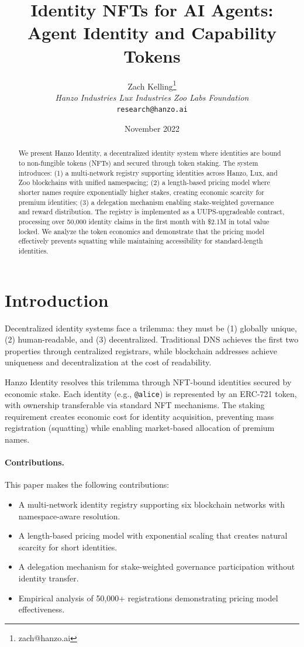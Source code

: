 \documentclass[11pt,twocolumn]{article}
\title{Identity NFTs for AI Agents: Agent Identity and Capability Tokens}
\author{Zach Kelling\thanks{zach@hanzo.ai} \\ \textit{Hanzo Industries \quad Lux Industries \quad Zoo Labs Foundation} \\ \texttt{research@hanzo.ai}}
\date{November 2022}
\begin{document}
\maketitle

\begin{abstract}
We present Hanzo Identity, a decentralized identity system where identities are bound to non-fungible tokens (NFTs) and secured through token staking. The system introduces: (1) a multi-network registry supporting identities across Hanzo, Lux, and Zoo blockchains with unified namespacing; (2) a length-based pricing model where shorter names require exponentially higher stakes, creating economic scarcity for premium identities; (3) a delegation mechanism enabling stake-weighted governance and reward distribution. The registry is implemented as a UUPS-upgradeable contract, processing over 50,000 identity claims in the first month with \$2.1M in total value locked. We analyze the token economics and demonstrate that the pricing model effectively prevents squatting while maintaining accessibility for standard-length identities.
\end{abstract}

\section{Introduction}

Decentralized identity systems face a trilemma: they must be (1) globally unique, (2) human-readable, and (3) decentralized. Traditional DNS achieves the first two properties through centralized registrars, while blockchain addresses achieve uniqueness and decentralization at the cost of readability.

Hanzo Identity resolves this trilemma through NFT-bound identities secured by economic stake. Each identity (e.g., \texttt{@alice}) is represented by an ERC-721 token, with ownership transferable via standard NFT mechanisms. The staking requirement creates economic cost for identity acquisition, preventing mass registration (squatting) while enabling market-based allocation of premium names.

\paragraph{Contributions.} This paper makes the following contributions:
\begin{itemize}
    \item A multi-network identity registry supporting six blockchain networks with namespace-aware resolution.
    \item A length-based pricing model with exponential scaling that creates natural scarcity for short identities.
    \item A delegation mechanism for stake-weighted governance participation without identity transfer.
    \item Empirical analysis of 50,000+ registrations demonstrating pricing model effectiveness.
\end{itemize}
\end{document}
